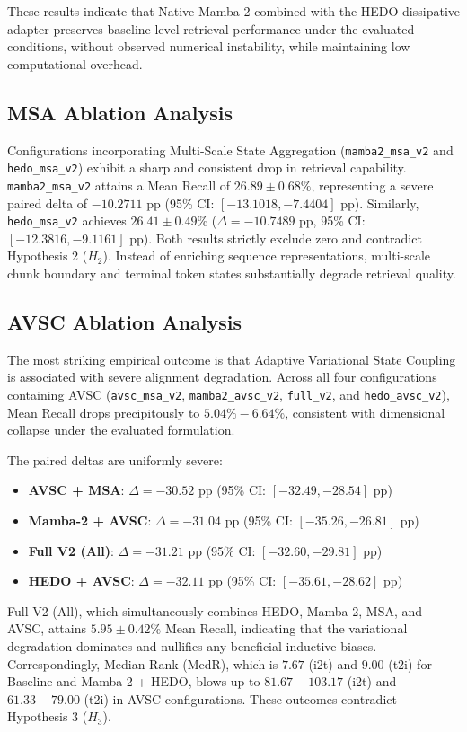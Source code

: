 \documentclass[10pt,journal,final]{IEEEtran}
\begin{document}
These results indicate that Native Mamba-2 combined with the HEDO dissipative adapter preserves baseline-level retrieval performance under the evaluated conditions, without observed numerical instability, while maintaining low computational overhead.

\subsection{MSA Ablation Analysis}
Configurations incorporating Multi-Scale State Aggregation (\texttt{mamba2\_msa\_v2} and \texttt{hedo\_msa\_v2}) exhibit a sharp and consistent drop in retrieval capability. \texttt{mamba2\_msa\_v2} attains a Mean Recall of $26.89 \pm 0.68\%$, representing a severe paired delta of $-10.2711$ pp (95\% CI: $[-13.1018, -7.4404]$ pp). Similarly, \texttt{hedo\_msa\_v2} achieves $26.41 \pm 0.49\%$ ($\Delta = -10.7489$ pp, 95\% CI: $[-12.3816, -9.1161]$ pp). Both results strictly exclude zero and contradict Hypothesis 2 ($H_2$). Instead of enriching sequence representations, multi-scale chunk boundary and terminal token states substantially degrade retrieval quality.

\subsection{AVSC Ablation Analysis}
The most striking empirical outcome is that Adaptive Variational State Coupling is associated with severe alignment degradation. Across all four configurations containing AVSC (\texttt{avsc\_msa\_v2}, \texttt{mamba2\_avsc\_v2}, \texttt{full\_v2}, and \texttt{hedo\_avsc\_v2}), Mean Recall drops precipitously to $5.04\%-6.64\%$, consistent with dimensional collapse under the evaluated formulation. 

The paired deltas are uniformly severe:
\begin{itemize}
    \item \textbf{AVSC + MSA}: $\Delta = -30.52$ pp (95\% CI: $[-32.49, -28.54]$ pp)
    \item \textbf{Mamba-2 + AVSC}: $\Delta = -31.04$ pp (95\% CI: $[-35.26, -26.81]$ pp)
    \item \textbf{Full V2 (All)}: $\Delta = -31.21$ pp (95\% CI: $[-32.60, -29.81]$ pp)
    \item \textbf{HEDO + AVSC}: $\Delta = -32.11$ pp (95\% CI: $[-35.61, -28.62]$ pp)
\end{itemize}
Full V2 (All), which simultaneously combines HEDO, Mamba-2, MSA, and AVSC, attains $5.95 \pm 0.42\%$ Mean Recall, indicating that the variational degradation dominates and nullifies any beneficial inductive biases. Correspondingly, Median Rank (MedR), which is $7.67$ (i2t) and $9.00$ (t2i) for Baseline and Mamba-2 + HEDO, blows up to $81.67-103.17$ (i2t) and $61.33-79.00$ (t2i) in AVSC configurations. These outcomes contradict Hypothesis 3 ($H_3$).
\end{document}
